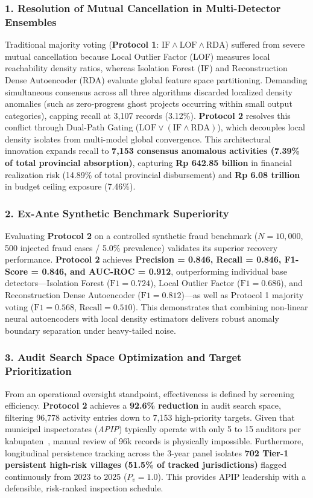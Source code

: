 \documentclass[runningheads]{llncs}
\begin{document}
\subsubsection{1. Resolution of Mutual Cancellation in Multi-Detector Ensembles}
Traditional majority voting (\textbf{Protocol 1}: $\text{IF} \land \text{LOF} \land \text{RDA}$) suffered from severe mutual cancellation because Local Outlier Factor (LOF) measures local reachability density ratios, whereas Isolation Forest (IF) and Reconstruction Dense Autoencoder (RDA) evaluate global feature space partitioning. Demanding simultaneous consensus across all three algorithms discarded localized density anomalies (such as zero-progress ghost projects occurring within small output categories), capping recall at 3,107 records (3.12\%). \textbf{Protocol 2} resolves this conflict through Dual-Path Gating ($\text{LOF} \lor (\text{IF} \land \text{RDA})$), which decouples local density isolates from multi-model global convergence. This architectural innovation expands recall to \textbf{7,153 consensus anomalous activities (7.39\% of total provincial absorption)}, capturing \textbf{Rp 642.85 billion} in financial realization risk (14.89\% of total provincial disbursement) and \textbf{Rp 6.08 trillion} in budget ceiling exposure (7.46\%).

\subsubsection{2. Ex-Ante Synthetic Benchmark Superiority}
Evaluating \textbf{Protocol 2} on a controlled synthetic fraud benchmark ($N=10,000$, 500 injected fraud cases / 5.0\% prevalence) validates its superior recovery performance. \textbf{Protocol 2} achieves \textbf{Precision = 0.846, Recall = 0.846, F1-Score = 0.846, and AUC-ROC = 0.912}, outperforming individual base detectors---Isolation Forest ($\text{F1} = 0.724$), Local Outlier Factor ($\text{F1} = 0.686$), and Reconstruction Dense Autoencoder ($\text{F1} = 0.812$)---as well as Protocol 1 majority voting ($\text{F1} = 0.568$, $\text{Recall} = 0.510$). This demonstrates that combining non-linear neural autoencoders with local density estimators delivers robust anomaly boundary separation under heavy-tailed noise.

\subsubsection{3. Audit Search Space Optimization and Target Prioritization}
From an operational oversight standpoint, effectiveness is defined by screening efficiency. \textbf{Protocol 2} achieves a \textbf{92.6\% reduction} in audit search space, filtering 96,778 activity entries down to 7,153 high-priority targets. Given that municipal inspectorates (\textit{APIP}) typically operate with only 5 to 15 auditors per kabupaten~\cite{ref12}, manual review of 96k records is physically impossible. Furthermore, longitudinal persistence tracking across the 3-year panel isolates \textbf{702 Tier-1 persistent high-risk villages (51.5\% of tracked jurisdictions)} flagged continuously from 2023 to 2025 ($P_v = 1.0$). This provides APIP leadership with a defensible, risk-ranked inspection schedule.
\end{document}
